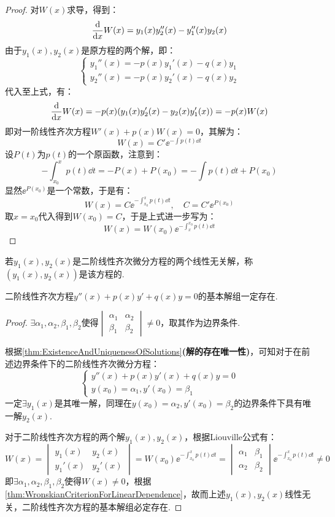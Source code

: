 \begin{proof}
    对$W(x)$求导，得到：
    \[\dv{x}W(x) = y_1(x)y_2''(x) - y_1''(x)y_2(x)\]
    由于$y_1(x),y_2(x)$是原方程的两个解，即：
    \[\begin{cases}
        y_1''(x) = - p(x)y_1'(x) - q(x)y_1 \\
        y_2''(x) = - p(x)y_2'(x) - q(x)y_2
    \end{cases}\]
    代入至上式，有：
    \[\dv{x}W(x) = -p(x)(y_1(x)y_2'(x) - y_2(x)y_1'(x)) = -p(x)W(x)\]
    即对一阶线性齐次方程$W'(x) + p(x)W(x) = 0$，其解为：
    \[W(x) = C'\ee^{-\int p(t)\dd{t}}\]
    设$P(t)$为$p(t)$的一个原函数，注意到：
    \[-\int_{x_0}^{x}p(t)\dd{t} = -P(x)+P(x_0) = -\int p(t)\dd{t} + P(x_0)\]
    显然$\ee^{P(x_0)}$是一个常数，于是有：
    \[W(x) = C\ee^{-\int_{x_0}^{x}p(t)\dd{t}},\quad C = C'\ee^{P(x_0)}\]
    取$x = x_0$代入得到$W(x_0) = C$，于是上式进一步写为：
    \[W(x) = W(x_0)\ee^{-\int_{x}^{x_0}p(t)\dd{t}}\]
\end{proof}

\begin{definition}
    若$y_1(x),y_2(x)$是二阶线性齐次微分方程的两个线性无关解，称$(y_1(x),y_2(x))$是该方程的.
\end{definition}

\begin{theorem}
    二阶线性齐次方程$y''(x) + p(x)y' + q(x)y = 0$的基本解组一定存在.
\end{theorem}

\begin{proof}
    $\exists \alpha_1,\alpha_2,\beta_1,\beta_2$使得$\begin{vmatrix}
        \alpha_1 & \alpha_2 \\
        \beta_1 & \beta_2
    \end{vmatrix} \neq 0$，取其作为边界条件.
    
    根据\cref{thm:ExistenceAndUniquenessOfSolutions}\textbf{(解的存在唯一性)}，可知对于在前述边界条件下的二阶线性齐次微分方程：
    \[\begin{cases}
        y''(x) + p(x)y'(x) + q(x)y = 0\\
        y(x_0) = \alpha_1, y'(x_0) = \beta_1
    \end{cases}\]
    一定$\exists y_1(x)$是其唯一解，同理在$y(x_0) = \alpha_2,y'(x_0) = \beta_2$的边界条件下具有唯一解$y_2(x)$.

    对于二阶线性齐次方程的两个解$y_1(x),y_2(x)$，根据Liouville公式有：
    \[W(x) = \begin{vmatrix}
        y_1(x) & y_2(x) \\
        y_1'(x) & y_2'(x)
    \end{vmatrix} = W(x_0)\ee^{-\int_{x_0}^{x}p(t)\dd{t}} = \begin{vmatrix}
        \alpha_1 & \beta_1 \\
        \alpha_2 & \beta_2
    \end{vmatrix}\ee^{-\int_{x_0}^{x}p(t)\dd{t}} \neq 0\]
    即$\exists \alpha_1,\alpha_2,\beta_1,\beta_2$使得$W(x) \neq 0$，根据\cref{thm:WronskianCriterionForLinearDependence}，故而上述$y_1(x),y_2(x)$线性无关，二阶线性齐次方程的基本解组必定存在.
\end{proof}

